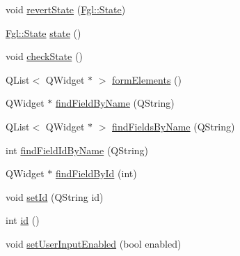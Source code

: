 \begin{DoxyCompactItemize}
\item 
void \hyperlink{classFglForm_a4d2edce15aac96b22d221a11c0e7681e}{revertState} (\hyperlink{namespaceFgl_a66700792cb225549384ae76c1057cf22}{Fgl::State})
\item 
\hyperlink{namespaceFgl_a66700792cb225549384ae76c1057cf22}{Fgl::State} \hyperlink{classFglForm_aeed42adf5a051006db1742e2b48617e1}{state} ()
\item 
void \hyperlink{classFglForm_a0ef6e6d0ddf327e89c3e2d54be8548a6}{checkState} ()
\item 
QList$<$ QWidget $\ast$ $>$ \hyperlink{classFglForm_ab40c533416d35aac75f2ccf5157a3cf2}{formElements} ()
\item 
QWidget $\ast$ \hyperlink{classFglForm_a7490b2d18830368110a69983f19d65cf}{findFieldByName} (QString)
\item 
QList$<$ QWidget $\ast$ $>$ \hyperlink{classFglForm_aa9bed6529e8937fdf1ebed65ca23cc45}{findFieldsByName} (QString)
\item 
int \hyperlink{classFglForm_a4d506d1f05b8ac540fe33dfa1524d681}{findFieldIdByName} (QString)
\item 
QWidget $\ast$ \hyperlink{classFglForm_a997cd55b341e14c89fdc300efe75b907}{findFieldById} (int)
\item 
void \hyperlink{classFglForm_a7010467be800cf868884b589f8ce8ce7}{setId} (QString id)
\item 
int \hyperlink{classFglForm_a4fc9bc745910f209c6f54f509293bd73}{id} ()
\item 
void \hyperlink{classFglForm_a47d0bbf071cbf0051b72c44a90062f81}{setUserInputEnabled} (bool enabled)
\end{DoxyCompactItemize}
